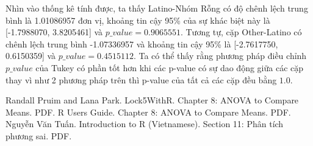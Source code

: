 \documentclass[a4paper,12pt]{article}
\begin{document}
	Nhìn vào thống kê tính được, ta thấy Latino-Nhóm Rỗng có độ chênh lệch trung bình là 1.01086957 đơn vị, khoảng tin cậy 95\% của sự khác biệt này là [-1.7988070, 3.8205461] và $p\_value = 0.9065551$. Tương tự, cặp Other-Latino có chênh lệch trung bình -1.07336957 và khoảng tin cậy 95\% là [-2.7617750, 0.6150359] và $p\_value = 0.4515112$. Ta có thể thấy rằng phương pháp điều chỉnh $p\_value$ của Tukey có phần tốt hơn khi các p-value có sự dao động giữa các cặp thay vì như 2 phương pháp trên thì p-value của tất cả các cặp đều bằng $1.0$.
	
	\begin{thebibliography}{00}
		 Randall Pruim and Lana Park. Lock5WithR. Chapter 8: ANOVA to Compare Means. PDF.
		 R Users Guide. Chapter 8: ANOVA to Compare Means. PDF.
		 Nguyễn Văn Tuấn. Introduction to R (Vietnamese). Section 11: Phân tích phương sai. PDF.
	\end{thebibliography}
\end{document}
